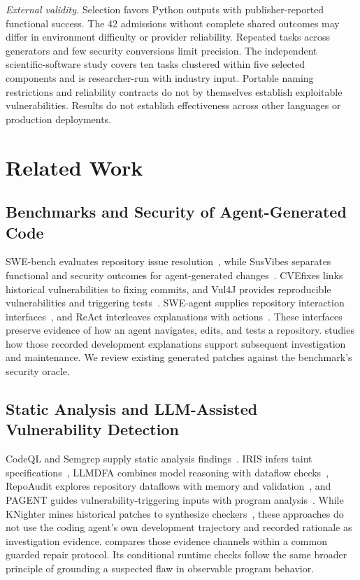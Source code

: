 \emph{External validity.} Selection favors Python outputs with publisher-reported functional success. The 42 admissions without complete shared outcomes may differ in environment difficulty or provider reliability. Repeated tasks across generators and few security conversions limit precision. The independent scientific-software study covers ten tasks clustered within five selected components and is researcher-run with industry input. Portable naming restrictions and reliability contracts do not by themselves establish exploitable vulnerabilities. Results do not establish effectiveness across other languages or production deployments.

\section{Related Work}
\subsection{Benchmarks and Security of Agent-Generated Code}
SWE-bench evaluates repository issue resolution~\cite{swebench}, while SusVibes separates functional and security outcomes for agent-generated changes~\cite{susvibes,susvibesartifact}. CVEfixes links historical vulnerabilities to fixing commits, and Vul4J provides reproducible vulnerabilities and triggering tests~\cite{cvefixes,vul4j}. SWE-agent supplies repository interaction interfaces~\cite{sweagent}, and ReAct interleaves explanations with actions~\cite{react}. These interfaces preserve evidence of how an agent navigates, edits, and tests a repository. \tracer{} studies how those recorded development explanations support subsequent investigation and maintenance. We review existing generated patches against the benchmark's security oracle.

\subsection{Static Analysis and LLM-Assisted Vulnerability Detection}
CodeQL and Semgrep supply static analysis findings~\cite{codeql,semgrep}. IRIS infers taint specifications~\cite{iris}, LLMDFA combines model reasoning with dataflow checks~\cite{llmdfa}, RepoAudit explores repository dataflows with memory and validation~\cite{repoaudit}, and PAGENT guides vulnerability-triggering inputs with program analysis~\cite{pagent}. While KNighter mines historical patches to synthesize checkers~\cite{knighter}, these approaches do not use the coding agent's own development trajectory and recorded rationale as investigation evidence. \tracer{} compares those evidence channels within a common guarded repair protocol. Its conditional runtime checks follow the same broader principle of grounding a suspected flaw in observable program behavior.

